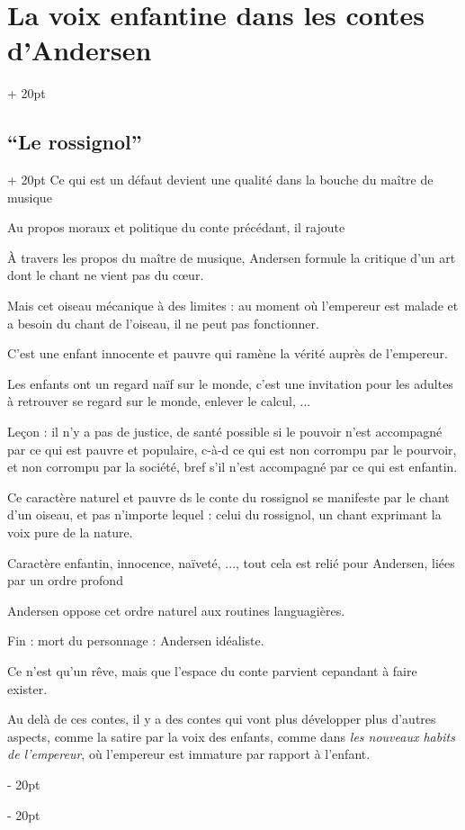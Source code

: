 \documentclass[a4paper, 12pt, twoside]{article}
\newcommand{\ind}[1][20pt]{\advance\leftskip + #1}
\newcommand{\deind}[1][20pt]{\advance\leftskip - #1}
\newenvironment{indt}[2][20pt]{#2 \par \ind[#1]}{\par \deind} %
\begin{document}
\begin{indt}{\section{La voix enfantine dans les contes d'Andersen}}
\begin{indt}{\subsection{``Le rossignol''}}
            Ce qui est un défaut devient une qualité dans la bouche du maître de musique
            
            Au propos moraux et politique du conte précédant, il rajoute 
            
            À travers les propos du maître de musique, Andersen formule la critique d'un art dont le chant ne vient pas du c\oe ur.
            
            Mais cet oiseau mécanique à des limites : au moment où l'empereur est malade et a besoin du chant de l'oiseau, il ne peut pas fonctionner.
            
            C'est une enfant innocente et pauvre qui ramène la vérité auprès de l'empereur.
            
            \vspace{12pt}
            
            Les enfants ont un regard naïf sur le monde, c'est une invitation pour les adultes à retrouver se regard sur le monde, enlever le calcul, ...
            
            Leçon : il n'y a pas de justice, de santé possible si le pouvoir n'est accompagné par ce qui est pauvre et populaire, c-à-d ce qui est non corrompu par le pourvoir, et non corrompu par la société, bref s'il n'est accompagné par ce qui est enfantin.
            
            Ce caractère naturel et pauvre ds le conte du rossignol se manifeste par le chant d'un oiseau, et pas n'importe lequel : celui du rossignol, un chant exprimant la voix pure de la nature.
            
            
            Caractère enfantin, innocence, naïveté, ..., tout cela est relié pour Andersen, liées par un ordre profond
            
            Andersen oppose cet ordre naturel aux routines languagières.
            
            Fin : mort du personnage : Andersen idéaliste.
            
            Ce n'est qu'un rêve, mais que l'espace du conte parvient cepandant à faire exister.
            
            \vspace{12pt}
            
            Au delà de ces contes, il y a des contes qui vont plus développer plus d'autres aspects, comme la satire par la voix des enfants, comme dans \textit{les nouveaux habits de l'empereur}, où l'empereur est immature par rapport à l'enfant.
        \end{indt}
        

\end{indt}
\end{document}
